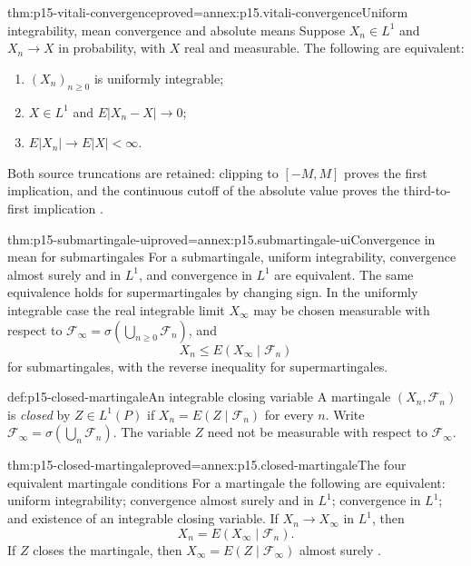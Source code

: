 \begin{hbtheorem}{thm:p15-vitali-convergence}{proved=annex:p15.vitali-convergence}{Uniform integrability, mean convergence and absolute means}
Suppose \(X_n\in L^1\) and \(X_n\to X\) in probability, with \(X\)
real and measurable. The following are equivalent:
\begin{enumerate}
\item \((X_n)_{n\geq0}\) is uniformly integrable;
\item \(X\in L^1\) and \(E|X_n-X|\to0\);
\item \(E|X_n|\to E|X|<\infty\).
\end{enumerate}
Both source truncations are retained: clipping to \([-M,M]\) proves
the first implication, and the continuous cutoff of the absolute value
proves the third-to-first implication
\cite[thm.~4.6.3]{DurrettPTEAuthor2019}.
\end{hbtheorem}

\begin{hbtheorem}{thm:p15-submartingale-ui}{proved=annex:p15.submartingale-ui}{Convergence in mean for submartingales}
For a submartingale, uniform integrability, convergence almost surely
and in \(L^1\), and convergence in \(L^1\) are equivalent.
The same equivalence holds for supermartingales by changing sign.
In the uniformly integrable case the real integrable limit \(X_\infty\)
may be chosen measurable with respect to
\(\mathcal F_\infty=\sigma(\bigcup_{n\geq0}\mathcal F_n)\), and
\[
        X_n\leq E(X_\infty\mid\mathcal F_n)
\]
for submartingales, with the reverse inequality for supermartingales.
\end{hbtheorem}

\begin{hbdefinition}{def:p15-closed-martingale}{An integrable closing variable}
A martingale \((X_n,\mathcal F_n)\) is \emph{closed} by \(Z\in L^1(P)\)
if \(X_n=E(Z\mid\mathcal F_n)\) for every \(n\).
Write \(\mathcal F_\infty=\sigma(\bigcup_n\mathcal F_n)\).
The variable \(Z\) need not be measurable with respect to
\(\mathcal F_\infty\).
\end{hbdefinition}

\begin{hbtheorem}{thm:p15-closed-martingale}{proved=annex:p15.closed-martingale}{The four equivalent martingale conditions}
For a martingale the following are equivalent: uniform integrability;
convergence almost surely and in \(L^1\); convergence in \(L^1\);
and existence of an integrable closing variable.
If \(X_n\to X_\infty\) in \(L^1\), then
\[
                       X_n=E(X_\infty\mid\mathcal F_n).
\]
If \(Z\) closes the martingale, then
\(X_\infty=E(Z\mid\mathcal F_\infty)\) almost surely
\cite[lems.~4.6.5--6, thm.~4.6.7]{DurrettPTEAuthor2019}.
\end{hbtheorem}

